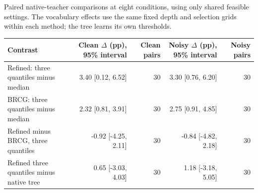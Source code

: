 \begin{kbtable}
\centering
\caption{Paired native-teacher comparisons at eight conditions, using only shared feasible settings. The vocabulary effects use the same fixed depth and selection grids within each method; the tree learns its own thresholds.}
\label{tab:followup_native_differences}
\small
\begin{adjustbox}{max width=\linewidth}
\begin{tabular}{lrrrr}
\toprule
Contrast & Clean $\Delta$ (pp), 95\% interval & Clean pairs & Noisy $\Delta$ (pp), 95\% interval & Noisy pairs \\
\midrule
Refined: three quantiles minus median & 3.40 [0.12, 6.52] & 30 & 3.30 [0.76, 6.20] & 30 \\
BRCG: three quantiles minus median & 2.32 [0.81, 3.91] & 30 & 2.75 [0.91, 4.85] & 30 \\
Refined minus BRCG, three quantiles & -0.92 [-4.25, 2.11] & 30 & -0.84 [-4.82, 2.18] & 30 \\
Refined three quantiles minus native tree & 0.65 [-3.03, 4.03] & 30 & 1.18 [-3.18, 5.05] & 30 \\
\bottomrule
\end{tabular}
\end{adjustbox}
\end{kbtable}
